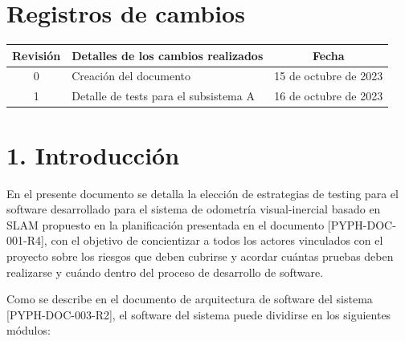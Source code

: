 \documentclass[
11pt, %
codirector, %
]{simple_charter}
\begin{document}
\maketitle
\thispagestyle{empty}
\pagebreak

\thispagestyle{empty}
{\setlength{\parskip}{0pt}
\setcounter{tocdepth}{2}
\tableofcontents{}
}
\pagebreak

\section*{Registros de cambios}
\label{sec:registros-de-cambios}

\begin{table}[ht]
\label{tab:registro}
\centering
\begin{tabularx}{\linewidth}{@{}|c|X|c|@{}}
\hline
\rowcolor[HTML]{C0C0C0}
Revisión &
\multicolumn{1}{c|}{\cellcolor[HTML]{C0C0C0}Detalles de los cambios realizados}
& Fecha
\\ \hline
0 & Creación del documento & 15 de octubre de 2023 \\ \hline
1 & Detalle de tests para el subsistema A & 16 de octubre de 2023 \\ \hline
\end{tabularx}
\end{table}

\pagebreak

\section{1. Introducción}
\label{sec:1-introduccion}

En el presente documento se detalla la elección de estrategias de testing para el software
desarrollado para el sistema de odometría visual-inercial basado en SLAM propuesto en la planificación presentada en el documento [PYPH-DOC-001-R4], con el objetivo de
concientizar a todos los actores vinculados con el proyecto sobre los riesgos que deben cubrirse y
acordar cuántas pruebas deben realizarse y cuándo dentro del proceso de desarrollo de software.

Como se describe en el documento de arquitectura de software del sistema [PYPH-DOC-003-R2], el
software del sistema puede dividirse en los siguientes módulos:
\end{document}
